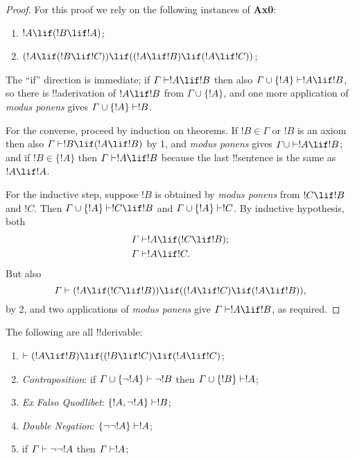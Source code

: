 \documentclass[../../include/open-logic-section]{subfiles}
\begin{document}
\begin{proof} For this proof we rely on the following instances
of \textbf{Ax0}: 
\begin{enumerate} 
\item $!A \lif (!B \lif !A)$; 
\item $(!A \lif (!B \lif !C)) \lif ((!A \lif !B) \lif (!A \lif !C))$; 
\end{enumerate}

The ``if'' direction is immediate; if $\Gamma \Proves !A \lif !B$ then also
$\Gamma \cup \{!A\}\Proves !A \lif !B$, so there is !!a{derivation} of
$!A\lif !B$ from $\Gamma \cup \{!A\}$, and one more application of
\emph{modus ponens} gives $\Gamma \cup \{!A\} \Proves !B$.

For the converse, proceed by induction on theorems. If $!B \in \Gamma$ or
$!B$ is an axiom then also $\Gamma \Proves !B \lif (!A \lif !B)$ by 1, and
\emph{modus ponens} gives $\Gamma\cup \Proves !A \lif !B$; and if $!B \in
\{ !A\}$ then $\Gamma \Proves !A \lif !B$ because the last !!{sentence} is
the same as $!A \lif !A$.

For the inductive step, suppose $!B$ is obtained by \emph{modus ponens}
from $!C \lif !B$ and $!C$. Then $\Gamma \cup \{ !A\} \Proves !C \lif !B$
and $\Gamma \cup \{ !A\} \Proves !C$. By inductive hypothesis, both
\begin{align*} 
& \Gamma \Proves !A \lif (!C \lif !B); \\ 
& \Gamma \Proves !A \lif !C. 
\end{align*} 
But also \[ \Gamma \Proves (!A \lif (!C \lif !B))
\lif ((!A\lif !C) \lif (!A \lif !B)), \] by 2, and two applications of
\emph{modus ponens} give $\Gamma \Proves !A \lif !B$, as required.
\end{proof}

\begin{prop} The following are all !!{derivable}:
\begin{enumerate} 
\item $\Proves (!A \lif !B) \lif ((!B \lif !C) \lif (!A
\lif !C)$;  
\item \emph{Contraposition}: if $\Gamma
\cup \{ \lnot !A\} \Proves \lnot !B$ then $\Gamma \cup \{ !B\} \Proves !A$;
\item \emph{Ex Falso Quodlibet}: $\{ !A, \lnot!A\}
\Proves !B$;  
\item \emph{Double Negation}: $\{
\lnot\lnot!A\} \Proves !A$; 
\item if $\Gamma \Proves
\lnot\lnot!A$ then $\Gamma \Proves !A$;
\end{enumerate} \end{prop}
\end{document}

